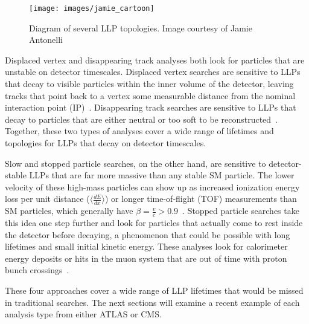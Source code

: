 \documentclass[12pt]{article}
\begin{document}
        \noindent \begin{figure}[htbp] \begin{center}
        \texttt{[image: images/jamie\_cartoon]}
        \caption{Diagram of several LLP topologies. Image courtesy of Jamie Antonelli}
        \label{jamie_cartoon}
        \end{center} \end{figure}

        Displaced vertex and disappearing track analyses both look for particles that are unstable on detector timescales. Displaced vertex searches are sensitive to LLPs that decay to visible particles within the inner volume  of the detector, leaving tracks that point back to a vertex some measurable distance from the nominal interaction point (IP)~\cite{atlas_displaced}. Disappearing track searches are sensitive to LLPs that decay to particles that are either neutral or too soft to be reconstructed~\cite{atlas_disappearing}. Together, these two types of analyses cover a wide range of lifetimes and topologies for LLPs that decay on detector timescales.

        Slow and stopped particle searches, on the other hand, are sensitive to detector-stable LLPs that are far more massive than any stable SM particle. The lower velocity of these high-mass particles can show up as increased ionization energy loss per unit distance ($\langle\frac{dE}{dx}\rangle$) or longer time-of-flight (TOF) measurements than SM particles, which generally have $\beta = \frac{v}{c} > \num{0.9}$~\cite{cms_hscp}. Stopped particle searches take this idea one step further and look for particles that actually come to rest inside the detector before decaying, a phenomenon that could be possible with long lifetimes and small initial kinetic energy. These analyses look for calorimeter energy deposits or hits in the muon system that are out of time with proton bunch crossings~\cite{cms_stopped}.

        These four approaches cover a wide range of LLP lifetimes that would be missed in traditional searches. The next sections will examine a recent example of each analysis type from either ATLAS or CMS.
\end{document}
